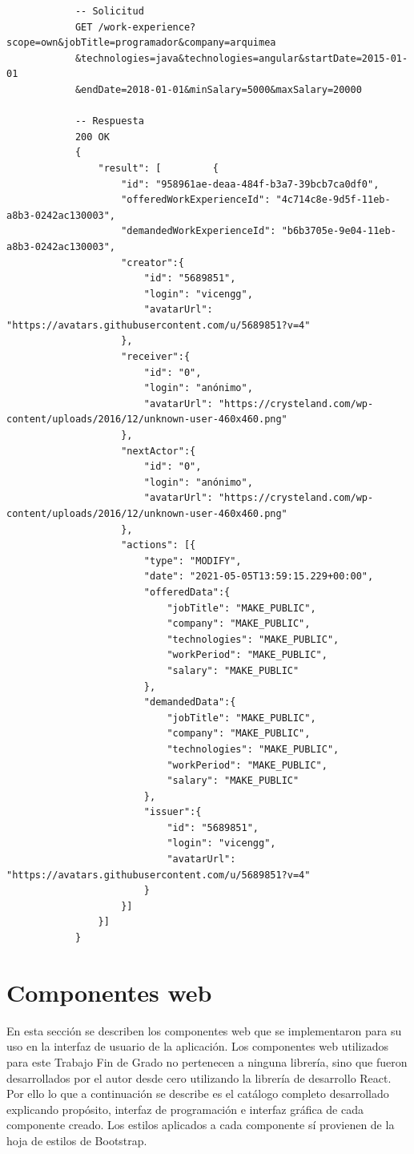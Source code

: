 \documentclass[a4paper, 12pt]{book}
\begin{document}
        {\scriptsize
    \linespread{1}
    \begin{verbatim}
			-- Solicitud
			GET /work-experience?scope=own&jobTitle=programador&company=arquimea
			&technologies=java&technologies=angular&startDate=2015-01-01
			&endDate=2018-01-01&minSalary=5000&maxSalary=20000

			-- Respuesta
			200 OK
			{
			    "result": [			{
			        "id": "958961ae-deaa-484f-b3a7-39bcb7ca0df0",
			        "offeredWorkExperienceId": "4c714c8e-9d5f-11eb-a8b3-0242ac130003",
			        "demandedWorkExperienceId": "b6b3705e-9e04-11eb-a8b3-0242ac130003",
			        "creator":{
			            "id": "5689851",
			            "login": "vicengg",
			            "avatarUrl": "https://avatars.githubusercontent.com/u/5689851?v=4"
			        },
			        "receiver":{
			            "id": "0",
			            "login": "anónimo",
			            "avatarUrl": "https://crysteland.com/wp-content/uploads/2016/12/unknown-user-460x460.png"
			        },
			        "nextActor":{
			            "id": "0",
			            "login": "anónimo",
			            "avatarUrl": "https://crysteland.com/wp-content/uploads/2016/12/unknown-user-460x460.png"
			        },
			        "actions": [{
			            "type": "MODIFY",
			            "date": "2021-05-05T13:59:15.229+00:00",
			            "offeredData":{
			                "jobTitle": "MAKE_PUBLIC",
			                "company": "MAKE_PUBLIC",
			                "technologies": "MAKE_PUBLIC",
			                "workPeriod": "MAKE_PUBLIC",
			                "salary": "MAKE_PUBLIC"
			            },
			            "demandedData":{
			                "jobTitle": "MAKE_PUBLIC",
			                "company": "MAKE_PUBLIC",
			                "technologies": "MAKE_PUBLIC",
			                "workPeriod": "MAKE_PUBLIC",
			                "salary": "MAKE_PUBLIC"
			            },
			            "issuer":{
			                "id": "5689851",
			                "login": "vicengg",
			                "avatarUrl": "https://avatars.githubusercontent.com/u/5689851?v=4"
			            }
			        }]
			    }]
			}
    \end{verbatim}
    }


    \section{Componentes web}
    \label{sec:web_components}
    En esta sección se describen los componentes web que se implementaron para su uso en la interfaz de usuario de la aplicación.
    Los componentes web utilizados para este Trabajo Fin de Grado no pertenecen a ninguna librería, sino que fueron desarrollados por el autor desde
    cero utilizando la librería de desarrollo React.
    Por ello lo que a continuación se describe es el catálogo completo desarrollado
    explicando propósito, interfaz de programación e interfaz gráfica
    de cada componente creado. Los estilos aplicados a cada componente sí provienen de la hoja de estilos de Bootstrap.
\end{document}
